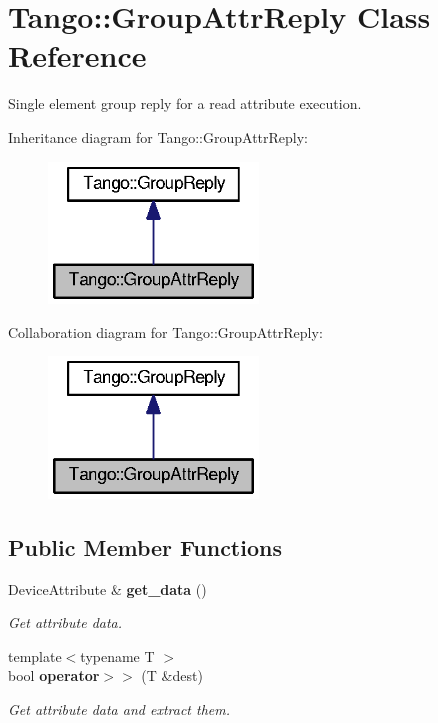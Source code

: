 \section{Tango\-:\-:Group\-Attr\-Reply Class Reference}
\label{classTango_1_1GroupAttrReply}


Single element group reply for a read attribute execution.  




Inheritance diagram for Tango\-:\-:Group\-Attr\-Reply\-:
\nopagebreak
\begin{figure}[H]
\begin{center}
\leavevmode
\includegraphics[width=158pt]{df/dc0/classTango_1_1GroupAttrReply__inherit__graph}
\end{center}
\end{figure}


Collaboration diagram for Tango\-:\-:Group\-Attr\-Reply\-:
\nopagebreak
\begin{figure}[H]
\begin{center}
\leavevmode
\includegraphics[width=158pt]{d1/d11/classTango_1_1GroupAttrReply__coll__graph}
\end{center}
\end{figure}
\subsection*{Public Member Functions}
\begin{DoxyCompactItemize}
\item 
Device\-Attribute \& {\bf get\-\_\-data} ()
\begin{DoxyCompactList}\small\item\em Get attribute data. \end{DoxyCompactList}\item 
{\footnotesize template$<$typename T $>$ }\\bool {\bf operator$>$$>$} (T \&dest)
\begin{DoxyCompactList}\small\item\em Get attribute data and extract them. \end{DoxyCompactList}\end{DoxyCompactItemize}
